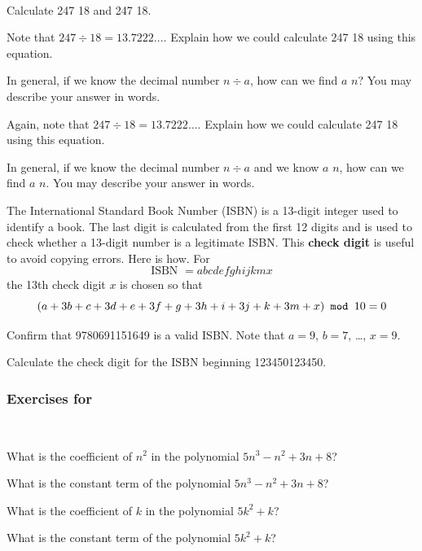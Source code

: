 \begin{exer}[\exerE] %
\label{exer_calculate_div_mod_division}
~
    \begin{exerpart}
        \item Calculate 247  18 and 247  18.
        \item Note that $247 \div 18= 13.7222\ldots$.  Explain how we could calculate 247  18 using this equation.
        \item In general, if we know the decimal number $n \div a$, how can we find $a$  $n$? You may describe your answer in words.
        \item Again, note that $247 \div 18= 13.7222\ldots$.  Explain how we could calculate 247  18 using this equation. 
        \item In general, if we know the decimal number $n \div a$ and we know $a$  $n$, how can we find $a$  $n$. You may describe your answer in words.
    \end{exerpart}
\end{exer}

\begin{exer}[\exerE] %
\label{exer_isbn}
    The International Standard Book Number (ISBN) is a 13-digit integer used to identify a book.  The last digit is calculated from the first 12 digits and is used to check whether a 13-digit number is a legitimate ISBN.  This \textbf{check digit} is useful to avoid copying errors. Here is how.  For 
        $$\text{ISBN } = abcdefghijkmx$$
    the 13th check digit $x$ is chosen so that 
        $$(a + 3b + c + 3d + e + 3f + g + 3h + i + 3j + k + 3m + x) \texttt{ mod } 10 = 0$$
            \begin{exerpart}
                \item Confirm that 9780691151649 is a valid ISBN.  Note that $a=9$, $b=7$, \ldots, $x=9$.
                \item Calculate the check digit for the ISBN beginning 123450123450.
            \end{exerpart}
\end{exer}


\subsubsection*{Exercises for  \subpolys}

\begin{exer}[\exerP] %
~
    \begin{exerpart}
        \item What is the coefficient of $n^2$ in the polynomial $5n^3-n^2+3n+8$?
        \item What is the constant term of the polynomial $5n^3-n^2+3n+8$?
        \item What is the coefficient of $k$ in the polynomial $5k^2+k$?
        \item What is the constant term of the polynomial $5k^2+k$?
    \end{exerpart}
\end{exer}

